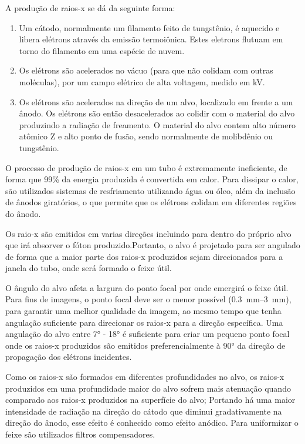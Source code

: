 \documentclass[11pt,a4paper]{article}
\begin{document}
                A produção de raios-x se dá da seguinte forma:

                \begin{enumerate}
                    \item Um cátodo, normalmente um filamento feito de tungstênio, é aquecido e libera elétrons através da emissão termoiônica. Estes eletrons flutuam em torno do filamento em uma espécie de nuvem.
                    \item Os elétrons são acelerados no vácuo (para que não colidam com outras moléculas), por um campo elétrico de alta voltagem, medido em kV. 
                    \item Os elétrons são acelerados na direção de um alvo, localizado em frente a um ânodo. Os elétrons são então desacelerados ao colidir com o material do alvo produzindo a radiação de freamento. O material do alvo contem alto número atômico Z e alto ponto de fusão, sendo normalmente de molibdênio ou tungstênio. 
                \end{enumerate}

                O processo de produção de raios-x em um tubo é extremamente ineficiente, de forma que 99\% da energia produzida é convertida em calor. Para dissipar o calor, são utilizados sistemas de resfriamento utilizando água ou óleo, além da inclusão de ânodos giratórios, o que permite que os elétrons colidam em diferentes regiões do ânodo.
                
                Os raio-x são emitidos em varias direções incluindo para dentro do próprio alvo que irá absorver o fóton produzido.Portanto,  o alvo é projetado para ser angulado de forma que a maior parte dos raios-x produzidos sejam direcionados para a janela do tubo, onde será formado o feixe útil. 
                
                O ângulo do alvo afeta a largura do ponto focal por onde emergirá o feixe útil. Para fins de imagens, o ponto focal deve ser o menor possível (\qtyrange{0.3}{3}{mm}), para garantir uma melhor qualidade da imagem, ao mesmo tempo que tenha angulação suficiente para direcionar os raios-x para a direção específica. Uma angulação do alvo entre \ang{7} - \ang{18} é suficiente para criar um pequeno ponto focal onde os raios-x produzidos são emitidos preferencialmente à \ang{90} da direção de propagação dos elétrons incidentes.

                Como os raios-x são formados em diferentes profundidades no alvo, os raios-x produzidos em uma profundidade maior do alvo sofrem mais atenuação quando comparado aos raios-x produzidos na superfície do alvo; Portando há uma maior intensidade de radiação na direção do cátodo que diminui gradativamente na direção do ânodo, esse efeito é conhecido como efeito anódico. Para uniformizar o feixe são utilizados filtros compensadores.
\end{document}
